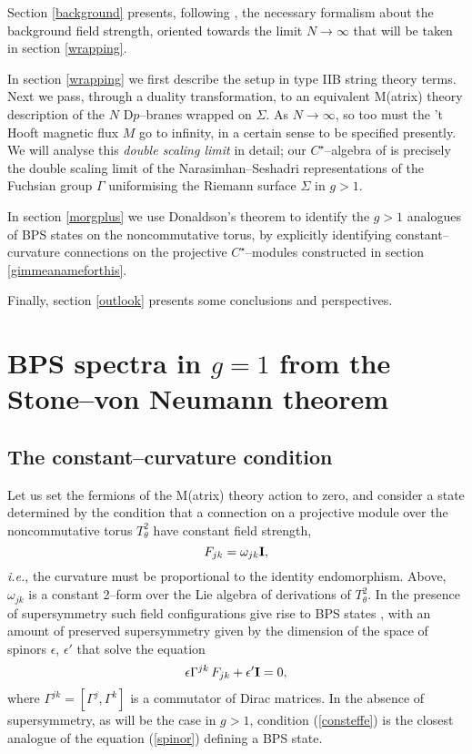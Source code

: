 \documentclass[a4paper,a4paper]{article}
\begin{document}
Section \ref{background} presents, following \cite{BOUWMATHAI, KAPUSTIN},
the necessary formalism about the background field strength, oriented towards 
the limit $N\to\infty$ that will be taken in section \ref{wrapping}. 

In section \ref{wrapping} we first describe the setup in type IIB string theory terms. 
Next we pass, through a duality transformation, to an equivalent M(atrix) theory 
description of the $N$ D$p$--branes wrapped on $\Sigma$. As $N\rightarrow\infty$, 
so too must the 't Hooft magnetic flux $M$ go to infinity, in a certain sense to be 
specified presently. We will analyse this {\it double scaling limit} in detail; 
our $C^{\star}$--algebra of \cite{PROCEEDINGS} is precisely the double scaling limit 
of the Narasimhan--Seshadri representations of the Fuchsian group $\Gamma$ 
uniformising the Riemann surface $\Sigma$ in $g>1$. 

In section \ref{morgplus} we use Donaldson's theorem to identify the $g>1$ 
analogues of BPS states on the noncommutative torus, by explicitly identifying 
constant--curvature connections on the projective $C^{\star}$--modules 
constructed in section \ref{gimmeanameforthis}. 

Finally, section \ref{outlook} presents some conclusions and perspectives. 

\section{BPS spectra in $g=1$ from the Stone--von Neumann theorem}\label{morita}  
   
\subsection{The constant--curvature condition}\label{ccurvcon}  
  
Let us set the fermions of the M(atrix) theory action to zero, 
and consider a state determined by the condition that a connection on a 
projective module over the noncommutative torus $T_{\theta}^{2}$ 
have constant field strength,  
\begin{equation}  
F_{jk}=\omega_{jk}{\bf  I},  
\label{consteffe}
\end{equation}  
{\it i.e.}, the curvature must be proportional to the identity endomorphism.  
Above, $\omega_{jk}$ is a constant 2--form over the Lie algebra of  
derivations of $T_{\theta}^2$. In the presence of supersymmetry such field   
configurations give rise to BPS states \cite{CDS, SCHWARZ}, with an amount of preserved   
supersymmetry given by the dimension of the space of spinors $\epsilon$, 
$\epsilon'$ that solve the equation  
\begin{equation}  
\epsilon\Gamma^{jk}\, F_{jk} + \epsilon' {\bf  I}=0,  
\label{spinor}
\end{equation}  
where $\Gamma^{jk}=[\Gamma^j, \Gamma^k]$ is a commutator of Dirac matrices. 
In the absence of supersymmetry, as will be the case in $g>1$, 
condition (\ref{consteffe}) is the closest analogue 
of the equation (\ref{spinor}) defining a BPS state.  
  
\end{document}
